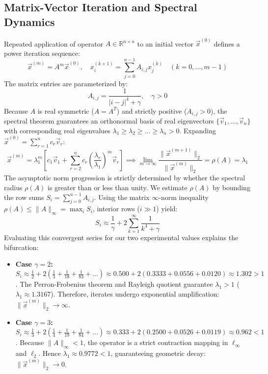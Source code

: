 \documentclass[11pt,a4paper]{article}
\begin{document}
\subsection{Matrix-Vector Iteration and Spectral Dynamics}
Repeated application of operator $A \in \mathbb{R}^{n \times n}$ to an initial vector $\vec{x}^{(0)}$ defines a power iteration sequence:
\begin{equation}
\vec{x}^{(m)} = A^m \vec{x}^{(0)}, \quad x_i^{(k+1)} = \sum_{j=0}^{n-1} A_{i,j} x_j^{(k)} \quad (k = 0, \dots, m-1)
\end{equation}
The matrix entries are parameterized by:
\begin{equation}
A_{i,j} = \frac{1}{|i - j|^4 + \gamma}, \quad \gamma > 0
\end{equation}
Because $A$ is real symmetric ($A = A^T$) and strictly positive ($A_{i,j} > 0$), the spectral theorem guarantees an orthonormal basis of real eigenvectors $\{\vec{v}_1, \dots, \vec{v}_n\}$ with corresponding real eigenvalues $\lambda_1 \ge \lambda_2 \ge \dots \ge \lambda_n > 0$. Expanding $\vec{x}^{(0)} = \sum_{r=1}^n c_r \vec{v}_r$:
\begin{equation}
\vec{x}^{(m)} = \lambda_1^m \left[ c_1 \vec{v}_1 + \sum_{r=2}^n c_r \left(\frac{\lambda_r}{\lambda_1}\right)^m \vec{v}_r \right] \implies \lim_{m \to \infty} \frac{\|\vec{x}^{(m+1)}\|_2}{\|\vec{x}^{(m)}\|_2} = \rho(A) = \lambda_1
\end{equation}
The asymptotic norm progression is strictly determined by whether the spectral radius $\rho(A)$ is greater than or less than unity. We estimate $\rho(A)$ by bounding the row sums $S_i = \sum_{j=0}^{n-1} A_{i,j}$. Using the matrix $\infty$-norm inequality $\rho(A) \le \|A\|_\infty = \max_i S_i$, interior rows ($i \gg 1$) yield:
\begin{equation}
S_i \approx \frac{1}{\gamma} + 2 \sum_{k=1}^\infty \frac{1}{k^4 + \gamma}
\end{equation}
Evaluating this convergent series for our two experimental values explains the bifurcation:
\begin{itemize}
    \item \textbf{Case $\gamma = 2$:} $S_i \approx \frac{1}{2} + 2\left(\frac{1}{3} + \frac{1}{18} + \frac{1}{83} + \dots\right) \approx 0.500 + 2(0.3333 + 0.0556 + 0.0120) \approx 1.302 > 1$. The Perron-Frobenius theorem and Rayleigh quotient guarantee $\lambda_1 > 1$ ($\lambda_1 \approx 1.3167$). Therefore, iterates undergo exponential amplification: $\|\vec{x}^{(m)}\|_2 \to \infty$.
    \item \textbf{Case $\gamma = 3$:} $S_i \approx \frac{1}{3} + 2\left(\frac{1}{4} + \frac{1}{19} + \frac{1}{84} + \dots\right) \approx 0.333 + 2(0.2500 + 0.0526 + 0.0119) \approx 0.962 < 1$. Because $\|A\|_\infty < 1$, the operator is a strict contraction mapping in $\ell_\infty$ and $\ell_2$. Hence $\lambda_1 \approx 0.9772 < 1$, guaranteeing geometric decay: $\|\vec{x}^{(m)}\|_2 \to 0$.
\end{itemize}
\end{document}
